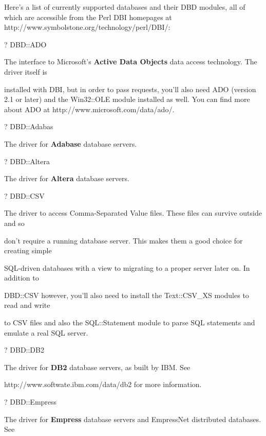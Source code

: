 \documentclass[a4paper,11pt]{book}
\begin{document}
\noindent 

\noindent Here's a list of currently supported databases and their DBD modules, all of which are accessible from the Perl DBI homepages at http://www.symbolstone.org/technology/perl/DBI/:

\noindent 

\noindent ? DBD::ADO

\noindent The interface to Microsoft's \textbf{Active Data Objects }data access technology. The driver itself is

\noindent installed with DBI, but in order to pass requests, you'll also need ADO (version 2.1 or later) and the Win32::OLE module installed as well. You can find more about ADO at http://www.microsoft.com/data/ado/.

\noindent 

\noindent 

\noindent ? DBD::Adabas

\noindent The driver for \textbf{Adabase }database servers.

\noindent 

\noindent ? DBD::Altera

\noindent The driver for \textbf{Altera }database servers.

\noindent 

\noindent ? DBD::CSV

\noindent The driver to access Comma-Separated Value files. These files can survive outside and so

\noindent don't require a running database server. This makes them a good choice for creating simple

\noindent SQL-driven databases with a view to migrating to a proper server later on. In addition to

\noindent DBD::CSV however, you'll also need to install the Text::CSV\_XS modules to read and write

\noindent to CSV files and also the SQL::Statement module to parse SQL statements and emulate a real SQL server.

\noindent 

\noindent ? DBD::DB2

\noindent The driver for \textbf{DB2 }database servers, as built by IBM. See

\noindent http://www.softwate.ibm.com/data/db2 for more information.

\noindent 

\noindent ? DBD::Empress

\noindent The driver for \textbf{Empress }database servers and EmpressNet distributed databases. See
\end{document}
